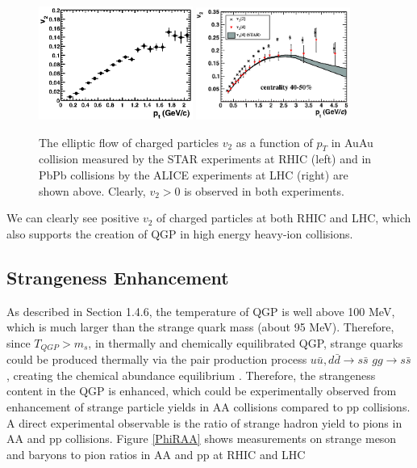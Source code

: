 \begin{figure}[hbtp]
\begin{center}
\includegraphics[width=0.45\textwidth]{Figures/Chapter1/STARV2Plot.eps}
\includegraphics[width=0.45\textwidth]{Figures/Chapter1/ALICEV2Plot.png}
\caption{The elliptic flow of charged particles $v_2$ as a function of $p_T$ in AuAu collision measured by the STAR experiments at RHIC (left) and in PbPb collisions by the ALICE experiments at LHC (right) are shown above. Clearly, $v_2 > 0$ is observed in both experiments.}
\label{V2}
\end{center}
\end{figure}   

We can clearly see positive $v_2$ of charged particles at both RHIC and LHC, which also supports the creation of QGP in high energy heavy-ion collisions.  
 
\subsection{Strangeness Enhancement} 

As described in Section 1.4.6, the temperature of QGP is well above 100 MeV, which is much larger than the strange quark mass (about 95 MeV). Therefore, since $T_{QGP} > m_s$, in thermally and chemically equilibrated QGP, strange quarks could be produced thermally via the pair production process $u \bar u, d \bar d \rightarrow s\bar s$ $gg \rightarrow s \bar s$, creating the chemical abundance equilibrium \cite{SSEnhance}. Therefore, the strangeness content in the QGP is enhanced, which could be experimentally observed from enhancement of strange particle yields in AA collisions compared to pp collisions. A direct experimental observable is the ratio of strange hadron yield to pions in AA and pp collisions. Figure \ref{PhiRAA} shows measurements on strange meson and baryons to pion ratios in AA and pp at RHIC and LHC 

